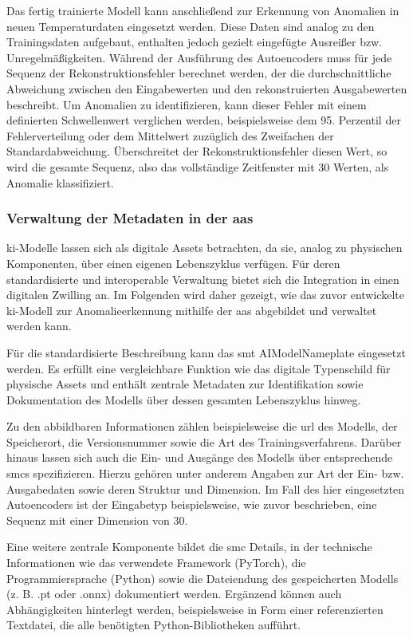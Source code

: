 Das fertig trainierte Modell kann anschließend zur Erkennung von Anomalien in neuen Temperaturdaten eingesetzt werden. 
Diese Daten sind analog zu den Trainingsdaten aufgebaut, enthalten jedoch gezielt eingefügte Ausreißer bzw. Unregelmäßigkeiten. 
Während der Ausführung des Autoencoders muss für jede Sequenz der Rekonstruktionsfehler berechnet werden, der die durchschnittliche Abweichung zwischen den Eingabewerten und den rekonstruierten Ausgabewerten beschreibt.
Um Anomalien zu identifizieren, kann dieser Fehler mit einem definierten Schwellenwert verglichen werden, beispielsweise dem 95. Perzentil der Fehlerverteilung oder dem Mittelwert zuzüglich des Zweifachen der Standardabweichung. 
Überschreitet der Rekonstruktionsfehler diesen Wert, so wird die gesamte Sequenz, also das vollständige Zeitfenster mit 30 Werten, als Anomalie klassifiziert.

\subsubsection{Verwaltung der Metadaten in der \acs{aas}}
\acs{ki}-Modelle lassen sich als digitale Assets betrachten, da sie, analog zu physischen Komponenten, über einen eigenen Lebenszyklus verfügen.  
Für deren standardisierte und interoperable Verwaltung bietet sich die Integration in einen digitalen Zwilling an.  
Im Folgenden wird daher gezeigt, wie das zuvor entwickelte \acs{ki}-Modell zur Anomalieerkennung mithilfe der \acs{aas} abgebildet und verwaltet werden kann.

Für die standardisierte Beschreibung kann das \acs{smt} AIModelNameplate \cite{SpezifikationAIModelNameplate} eingesetzt werden. 
Es erfüllt eine vergleichbare Funktion wie das digitale Typenschild für physische Assets und enthält zentrale Metadaten zur Identifikation sowie Dokumentation des Modells über dessen gesamten Lebenszyklus hinweg.

Zu den abbildbaren Informationen zählen beispielsweise die \acs{url} des Modells, der Speicherort, die Versionsnummer sowie die Art des Trainingsverfahrens. 
Darüber hinaus lassen sich auch die Ein- und Ausgänge des Modells über entsprechende \acsp{smc} spezifizieren. 
Hierzu gehören unter anderem Angaben zur Art der Ein- bzw. Ausgabedaten sowie deren Struktur und Dimension. 
Im Fall des hier eingesetzten Autoencoders ist der Eingabetyp beispielsweise, wie zuvor beschrieben, eine Sequenz mit einer Dimension von 30.

Eine weitere zentrale Komponente bildet die \acs{smc} Details, in der technische Informationen wie das verwendete Framework (PyTorch), die Programmiersprache (Python) sowie die Dateiendung des gespeicherten Modells (z. B. .pt oder .onnx) dokumentiert werden. 
Ergänzend können auch Abhängigkeiten hinterlegt werden, beispielsweise in Form einer referenzierten Textdatei, die alle benötigten Python-Bibliotheken aufführt.

